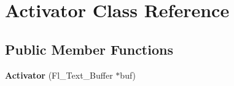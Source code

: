 \hypertarget{classActivator}{\section{\-Activator \-Class \-Reference}
\label{classActivator}
}
\subsection*{\-Public \-Member \-Functions}
\begin{DoxyCompactItemize}
\item 
\hypertarget{classActivator_a9b669b25b77b9afdc76dfbfa53ecf478}{{\bfseries \-Activator} (\-Fl\-\_\-\-Text\-\_\-\-Buffer $\ast$buf)}\label{classActivator_a9b669b25b77b9afdc76dfbfa53ecf478}

\end{DoxyCompactItemize}
